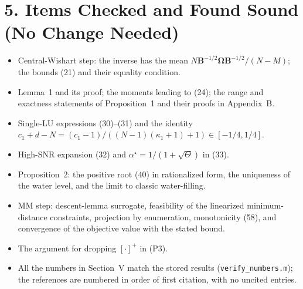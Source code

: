 \documentclass[10.5pt,a4paper]{article}
\begin{document}
\section*{5. Items Checked and Found Sound (No Change Needed)}
\begin{itemize}
\item Central-Wishart step: the inverse has the mean $N\mathbf B^{-1/2}\boldsymbol\Omega\mathbf B^{-1/2}/(N-M)$; the bounds (21) and their equality condition.
\item Lemma~1 and its proof; the moments leading to (24); the range and exactness statements of Proposition~1 and their proofs in Appendix~B.
\item Single-LU expressions (30)--(31) and the identity $c_1+d-N=(c_1-1)/((N-1)(\kappa_1+1)+1)\in[-1/4,1/4]$.
\item High-SNR expansion (32) and $\alpha^\star=1/(1+\sqrt{\Theta})$ in (33).
\item Proposition~2: the positive root (40) in rationalized form, the uniqueness of the water level, and the limit to classic water-filling.
\item MM step: descent-lemma surrogate, feasibility of the linearized minimum-distance constraints, projection by enumeration, monotonicity (58), and convergence of the objective value with the stated bound.
\item The argument for dropping $[\cdot]^+$ in (P3).
\item All the numbers in Section~V match the stored results (\texttt{verify\_numbers.m}); the references are numbered in order of first citation, with no uncited entries.
\end{itemize}
\end{document}
